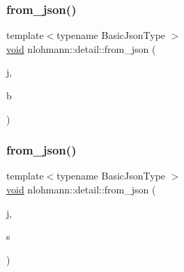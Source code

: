 \mbox{\label{namespacenlohmann_1_1detail_a58117f225f43d03e3a0a4a6f3d77c9d9}} 
\subsubsection{\texorpdfstring{from\_json()}{from\_json()}\hspace{0.1cm}{\footnotesize\ttfamily [2/18]}}
{\footnotesize\ttfamily template$<$typename Basic\+Json\+Type $>$ \\
\mbox{\hyperlink{namespacenlohmann_1_1detail_a59fca69799f6b9e366710cb9043aa77d}{void}} nlohmann\+::detail\+::from\+\_\+json (\begin{DoxyParamCaption}\item[{const Basic\+Json\+Type \&}]{j,  }\item[{typename Basic\+Json\+Type\+::boolean\+\_\+t \&}]{b }\end{DoxyParamCaption})}

\mbox{\label{namespacenlohmann_1_1detail_ad74d89f77ada7a57eff38b43d4bf2335}} 
\subsubsection{\texorpdfstring{from\_json()}{from\_json()}\hspace{0.1cm}{\footnotesize\ttfamily [3/18]}}
{\footnotesize\ttfamily template$<$typename Basic\+Json\+Type $>$ \\
\mbox{\hyperlink{namespacenlohmann_1_1detail_a59fca69799f6b9e366710cb9043aa77d}{void}} nlohmann\+::detail\+::from\+\_\+json (\begin{DoxyParamCaption}\item[{const Basic\+Json\+Type \&}]{j,  }\item[{typename Basic\+Json\+Type\+::string\+\_\+t \&}]{s }\end{DoxyParamCaption})}

\mbox{\label{namespacenlohmann_1_1detail_a2932f2bc2943dac6d51669312f4fc0f5}} 
